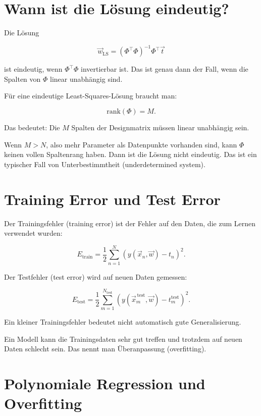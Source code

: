 \section{Wann ist die Lösung eindeutig?}

Die Lösung

\[
    \vec{w}_{\mathrm{LS}}
    =
    (\Phi^{\top}\Phi)^{-1}
    \Phi^{\top}\vec{t}
\]

ist eindeutig, wenn \(\Phi^{\top}\Phi\) invertierbar ist.
Das ist genau dann der Fall, wenn die Spalten von \(\Phi\) linear unabhängig sind.

\begin{conceptbox}
Für eine eindeutige Least-Squares-Lösung braucht man:

\[
    \mathrm{rank}(\Phi) = M.
\]

Das bedeutet:
Die \(M\) Spalten der Designmatrix müssen linear unabhängig sein.
\end{conceptbox}

Wenn \(M>N\), also mehr Parameter als Datenpunkte vorhanden sind, kann \(\Phi\) keinen vollen Spaltenrang haben.
Dann ist die Lösung nicht eindeutig.
Das ist ein typischer Fall von Unterbestimmtheit (underdetermined system).

\section{Training Error und Test Error}

Der Trainingsfehler (training error) ist der Fehler auf den Daten, die zum Lernen verwendet wurden:

\[
    E_{\mathrm{train}}
    =
    \frac{1}{2}
    \sum_{n=1}^{N}
    \left(
        y(\vec{x}_n,\vec{w})-t_n
    \right)^2.
\]

Der Testfehler (test error) wird auf neuen Daten gemessen:

\[
    E_{\mathrm{test}}
    =
    \frac{1}{2}
    \sum_{m=1}^{N_{\mathrm{test}}}
    \left(
        y(\vec{x}^{\,\mathrm{test}}_m,\vec{w})
        -
        t^{\mathrm{test}}_m
    \right)^2.
\]

\begin{conceptbox}
Ein kleiner Trainingsfehler bedeutet nicht automatisch gute Generalisierung.

Ein Modell kann die Trainingsdaten sehr gut treffen und trotzdem auf neuen Daten schlecht sein.
Das nennt man Überanpassung (overfitting).
\end{conceptbox}

\section{Polynomiale Regression und Overfitting}

